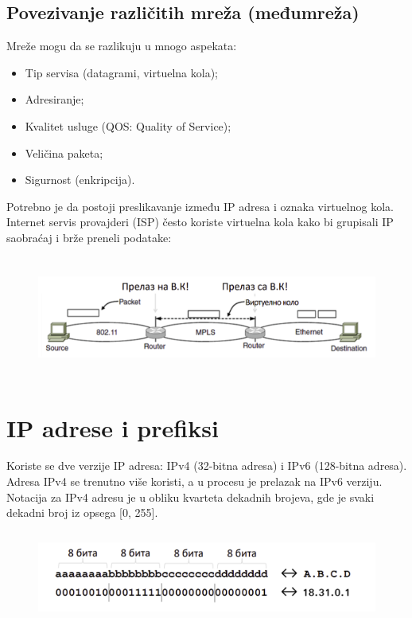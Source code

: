 \documentclass[a4paper]{article}
\begin{document}
    \subsection{Povezivanje različitih mreža (međumreža)}
        Mreže mogu da se razlikuju u mnogo aspekata:
        \begin{itemize}
            \item Tip servisa (datagrami, virtuelna kola);
            \item Adresiranje;
            \item Kvalitet usluge (QOS: Quality of Service);
            \item Veličina paketa;
            \item Sigurnost (enkripcija).
        \end{itemize}
        Potrebno je da postoji preslikavanje između IP adresa i oznaka virtuelnog kola. 
        Internet servis provajderi (ISP) često koriste virtuelna kola kako bi grupisali IP
        saobraćaj i brže preneli podatake:
        \begin{figure}[H]
            \begin{center}
                \includegraphics[width=120mm,height=40mm]{Slike/grupisanje_paketa.png}
            \end{center}
        \end{figure}

\section{IP adrese i prefiksi}
    Koriste se dve verzije IP adresa: IPv4 (32-bitna adresa) i IPv6 (128-bitna adresa). Adresa
    IPv4 se trenutno više koristi, a u procesu je prelazak na IPv6 verziju. Notacija za IPv4 adresu
    je u obliku kvarteta dekadnih brojeva, gde je svaki dekadni broj iz opsega [0, 255].  
    \begin{figure}[H]
        \begin{center}
            \includegraphics[width=120mm,height=30mm]{Slike/ipv4_notacija.png}
        \end{center}
    \end{figure}
\end{document}
